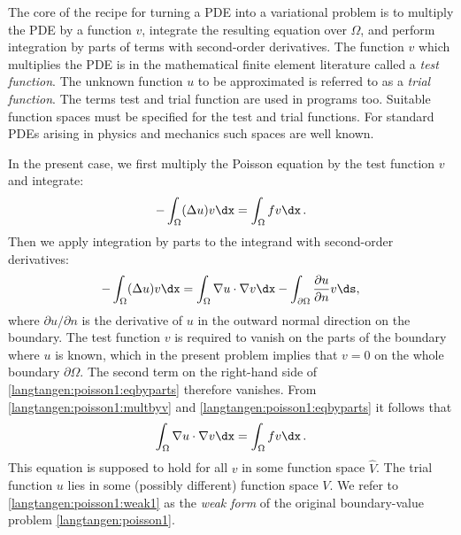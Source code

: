
The core of the recipe for turning a PDE into a variational problem is
to multiply the PDE by a function $v$, integrate the resulting
equation over $\Omega$, and perform integration by parts of terms with
second-order derivatives. The function $v$ which multiplies the PDE is
in the mathematical finite element literature called a \emph{test
  function}. The unknown function $u$ to be approximated is referred
to as a \emph{trial function}. The terms test and trial function are
used in \fenics{} programs too.  Suitable function spaces must be
specified for the test and trial functions.  For standard PDEs arising
in physics and mechanics such spaces are well known.

In the present case, we first multiply the Poisson equation
by the test function $v$ and integrate:
\begin{equation}
\label{langtangen:poisson1:multbyv}
 -\int_\Omega (\Delta u)v \dx = \int_\Omega fv\dx\langtangenep\end{equation}
Then we apply integration by parts to the integrand with
second-order derivatives:
\begin{equation}
\label{langtangen:poisson1:eqbyparts}
 -\int_\Omega (\Delta u) v \dx
   = \int_\Omega \nabla u\cdot\nabla v\dx -
     \int_{\partial\Omega} \frac{\partial u}{\partial n} v\ds,
\end{equation}
where $\partial u / \partial n$ is the
derivative of $u$ in the outward normal direction on the boundary.
The test function $v$ is required to vanish on the parts of the
boundary where $u$ is known, which in the present problem implies that
$v=0$ on the whole boundary $\partial\Omega$.  The second term on the
right-hand side of \eqref{langtangen:poisson1:eqbyparts} therefore
vanishes.  From \eqref{langtangen:poisson1:multbyv} and
\eqref{langtangen:poisson1:eqbyparts} it follows that
\begin{equation}
  \int_\Omega\nabla u\cdot\nabla v\dx = \int_\Omega fv\dx\langtangenep
\label{langtangen:poisson1:weak1}
\end{equation}
This equation is supposed to hold for all $v$ in some function space
$\hat V$. The trial function $u$ lies in some (possibly different)
function space $V$.  We refer to \eqref{langtangen:poisson1:weak1} as
the \emph{weak form} of the original boundary-value problem
\eqref{langtangen:poisson1}.

